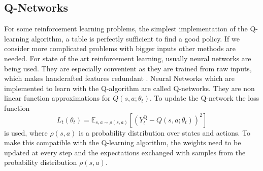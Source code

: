 \subsection{Q-Networks\anna}
For some reinforcement learning problems, the simplest implementation of the Q-learning algorithm, a table is perfectly sufficient to find a good policy.
If we consider more complicated problems with bigger inputs other methods are needed. For state of the art reinforcement learning, usually neural networks are being used.
They are especially convenient as they are trained from raw inputs, which makes handcrafted features redundant \cite{DBLP:journals/corr/MnihKSGAWR13}.
Neural Networks which are implemented to learn with the Q-algorithm are called Q-networks.
They are non linear function approximations for $Q(s,a;\theta_t)$.
To update the Q-network the loss function
\begin{equation}
L_{t}\left(\theta_{t}\right)=\mathbb{E}_{s, a \sim \rho(s,a)}\left[\left(Y_{t}^{\mathrm{Q}}-Q\left(s, a ; \theta_{t}\right)\right)^{2}\right]
\end{equation}
is used, where $\rho(s, a)$ is a probability distribution over states and actions. To make this compatible with the Q-learning algorithm, the weights need to be updated at every step and the expectations exchanged with samples from the probability distribution $\rho(s,a)$.
